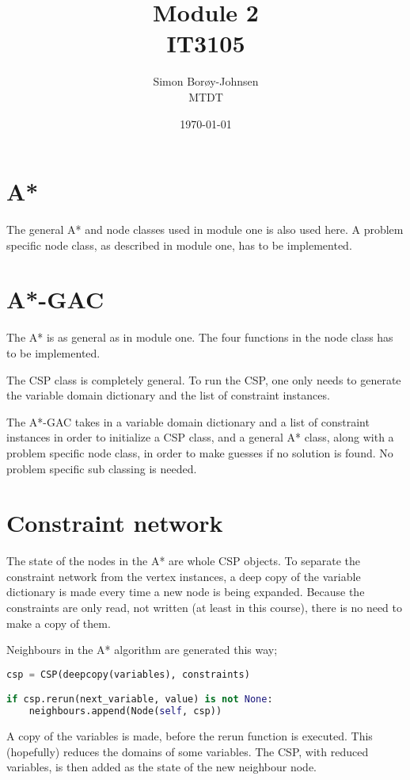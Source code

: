 \documentclass{article}
\begin{document}
\title{\textbf{Module 2} \\ IT3105}
\author{Simon Borøy-Johnsen \\ MTDT}
\date{\today}
\maketitle


\section{A*}
The general A* and node classes used in module one is also used here. A problem specific node class, as described in module one, has to be implemented.

\section{A*-GAC}
The A* is as general as in module one. The four functions in the node class has to be implemented.

The CSP class is completely general. To run the CSP, one only needs to generate the variable domain dictionary and the list of constraint instances.

The A*-GAC takes in a variable domain dictionary and a list of constraint instances in order to initialize a CSP class, and a general A* class, along with a problem specific node class, in order to make guesses if no solution is found. No problem specific sub classing is needed.

\section{Constraint network}
The state of the nodes in the A* are whole CSP objects. To separate the constraint network from the vertex instances, a deep copy of the variable dictionary is made every time a new node is being expanded. Because the constraints are only read, not written (at least in this course), there is no need to make a copy of them.

Neighbours in the A* algorithm are generated this way;
\begin{lstlisting}[language=Python]
csp = CSP(deepcopy(variables), constraints)

if csp.rerun(next_variable, value) is not None:
    neighbours.append(Node(self, csp))
\end{lstlisting}
A copy of the variables is made, before the rerun function is executed. This (hopefully) reduces the domains of some variables. The CSP, with reduced variables, is then added as the state of the new neighbour node.
\end{document}

